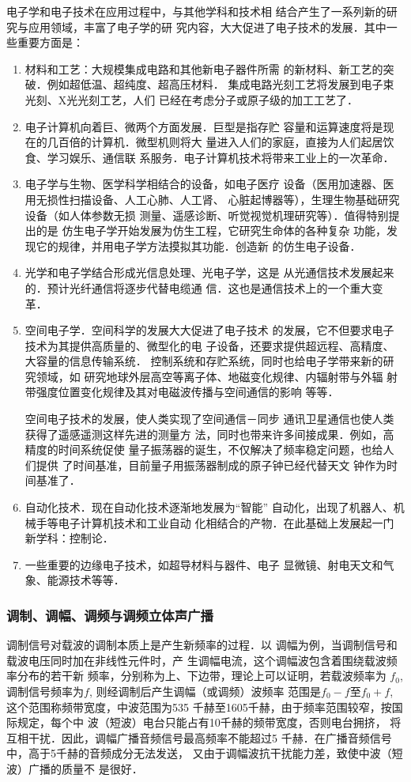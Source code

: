 电子学和电子技术在应用过程中，与其他学科和技术相
结合产生了一系列新的研究与应用领域，丰富了电子学的研
究内容，大大促进了电子技术的发展．其中一些重要方面是：
\begin{enumerate}
\item 材料和工艺：大规模集成电路和其他新电子器件所需
的新材料、新工艺的突破．例如超低温、超纯度、超高压材料．
集成电路光刻工艺将发展到电子束光刻、X光光刻工艺，人们
已经在考虑分子或原子级的加工工艺了．
\item 电子计算机向着巨、微两个方面发展．巨型是指存贮
容量和运算速度将是现在的几百倍的计算机．微型机则将大
量进入人们的家庭，直接为人们起居饮食、学习娱乐、通信联
系服务．电子计算机技术将带来工业上的一次革命．
\item 电子学与生物、医学科学相结合的设备，如电子医疗
设备（医用加速器、医用无损性扫描设备、人工心肺、人工肾、
心脏起博器等），生理生物基础研究设备（如人体参数无损
测量、遥感诊断、听觉视觉机理研究等）．值得特别提出的是
仿生电子学开始发展为仿生工程，它研究生命体的各种复杂
功能，发现它的规律，并用电子学方法摸拟其功能．创造新
的仿生电子设备．
\item 光学和电子学结合形成光信息处理、光电子学，这是
从光通信技术发展起来的．预计光纤通信将逐步代替电缆通
信．这也是通信技术上的一个重大变革．
\item 空间电子学．空间科学的发展大大促进了电子技术
的发展，它不但要求电子技术为其提供高质量的、微型化的电
子设备，还要求提供超远程、高精度、大容量的信息传输系统．
控制系统和存贮系统，同时也给电子学带来新的研究领域，如
研究地球外层高空等离子体、地磁变化规律、内辐射带与外辐
射带强度位置变化规律及其对电磁波传播与空间通信的影响
等等．

空间电子技术的发展，使人类实现了空间通信－同步
通讯卫星通信也使人类获得了遥感遥测这样先进的测量方
法，同时也带来许多间接成果．例如，高精度的时间系统促使
量子振荡器的诞生，不仅解决了频率稳定问题，也给人们提供
了时间基准，目前量子用振荡器制成的原子钟已经代替天文
钟作为时间基准了．
\item 自动化技术．现在自动化技术逐渐地发展为“智能”
自动化，出现了机器人、机械手等电子计算机技术和工业自动
化相结合的产物．在此基础上发展起一门新学科：控制论．
\item 一些重要的边缘电子技术，如超导材料与器件、电子
显微镜、射电天文和气象、能源技术等等．
\end{enumerate}

\subsubsection{调制、调幅、调频与调频立体声广播}
调制信号对载波的调制本质上是产生新频率的过程．以
调幅为例，当调制信号和载波电压同时加在非线性元件时，产
生调幅电流，这个调幅波包含着围绕载波频率分布的若干新
频率，分别称为上、下边带，理论上可以证明，若载波频率为
$f_0$, 调制信号频率为$f$, 则经调制后产生调幅（或调频）波频率
范围是$f_0-f$至$f_0+f$, 这个范围称频带宽度，中波范围为535
千赫至1605千赫，由于频率范围较窄，按国际规定，每个中
波（短波）电台只能占有10千赫的频带宽度，否则电台拥挤，
将互相干扰．因此，调幅广播音频信号最高频率不能超过5
千赫．在广播音频信号中，高于5千赫的音频成分无法发送，
又由于调幅波抗干扰能力差，致使中波（短波）广播的质量不
是很好．

